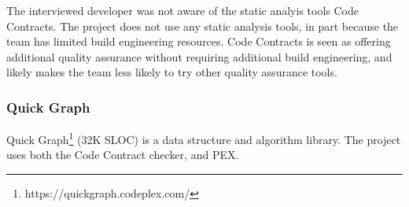 The interviewed developer was not aware of the static analyis tools
Code Contracts. The project does not use any static analysis tools, in
part because the team has limited build engineering resources. Code
Contracts is seen as offering additional quality assurance without
requiring additional build engineering, and likely makes the team less
likely to try other quality assurance tools.

\subsubsection{Quick Graph}

Quick Graph\footnote{https://quickgraph.codeplex.com/} (32K SLOC) is
a data structure and algorithm library. The project uses both the Code
Contract checker, and PEX.
